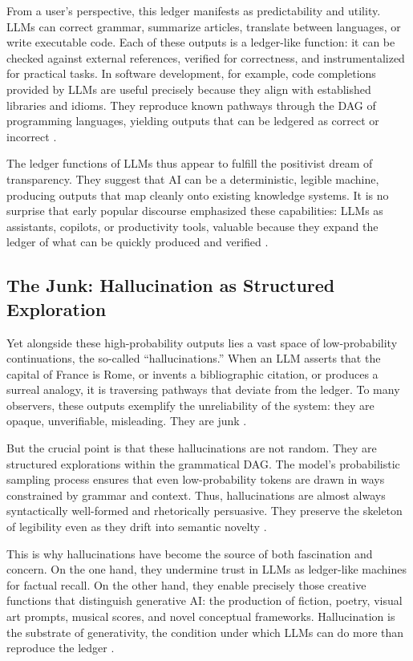 \documentclass[12pt]{article}
\begin{document}
{{{From a user’s perspective, this ledger manifests as predictability and utility. LLMs can correct grammar, summarize articles, translate between languages, or write executable code. Each of these outputs is a ledger-like function: it can be checked against external references, verified for correctness, and instrumentalized for practical tasks. In software development, for example, code completions provided by LLMs are useful precisely because they align with established libraries and idioms. They reproduce known pathways through the DAG of programming languages, yielding outputs that can be ledgered as correct or incorrect \citep{chen2021}.

The ledger functions of LLMs thus appear to fulfill the positivist dream of transparency. They suggest that AI can be a deterministic, legible machine, producing outputs that map cleanly onto existing knowledge systems. It is no surprise that early popular discourse emphasized these capabilities: LLMs as assistants, copilots, or productivity tools, valuable because they expand the ledger of what can be quickly produced and verified \citep{bommasani2021}.

\subsection{The Junk: Hallucination as Structured Exploration}
Yet alongside these high-probability outputs lies a vast space of low-probability continuations, the so-called ``hallucinations.'' When an LLM asserts that the capital of France is Rome, or invents a bibliographic citation, or produces a surreal analogy, it is traversing pathways that deviate from the ledger. To many observers, these outputs exemplify the unreliability of the system: they are opaque, unverifiable, misleading. They are junk \citep{bender2021}.

But the crucial point is that these hallucinations are not random. They are structured explorations within the grammatical DAG. The model’s probabilistic sampling process ensures that even low-probability tokens are drawn in ways constrained by grammar and context. Thus, hallucinations are almost always syntactically well-formed and rhetorically persuasive. They preserve the skeleton of legibility even as they drift into semantic novelty \citep{shanahan2023}.

This is why hallucinations have become the source of both fascination and concern. On the one hand, they undermine trust in LLMs as ledger-like machines for factual recall. On the other hand, they enable precisely those creative functions that distinguish generative AI: the production of fiction, poetry, visual art prompts, musical scores, and novel conceptual frameworks. Hallucination is the substrate of generativity, the condition under which LLMs can do more than reproduce the ledger \citep{hofstadter1995}.

}}}
\end{document}
